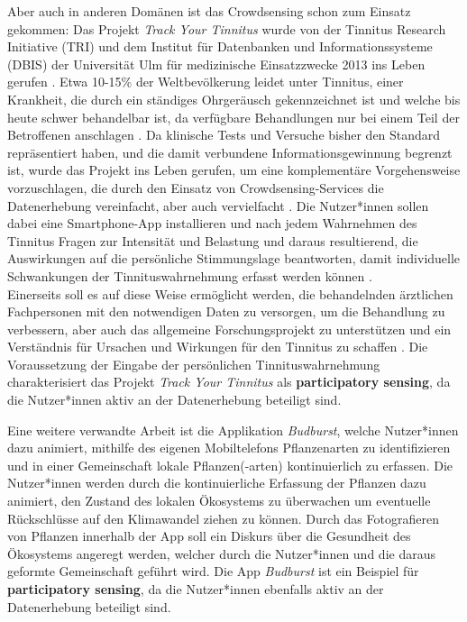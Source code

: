 Aber auch in anderen Domänen ist das Crowdsensing schon zum Einsatz gekommen: Das Projekt \textit{Track Your Tinnitus} wurde von der Tinnitus Research Initiative (TRI) und dem Institut für Datenbanken und Informationssysteme (DBIS) der Universität Ulm für medizinische Einsatzzwecke 2013 ins Leben gerufen \cite{Pryss2017}. Etwa 10-15\% der Weltbevölkerung leidet unter Tinnitus, einer Krankheit, die durch ein ständiges Ohrgeräusch gekennzeichnet ist und welche bis heute schwer behandelbar ist, da verfügbare Behandlungen nur bei einem Teil der Betroffenen anschlagen \cite{langguth2011review}. Da klinische Tests und Versuche bisher den Standard repräsentiert haben, und die damit verbundene Informationsgewinnung begrenzt ist, wurde das Projekt ins Leben gerufen, um eine komplementäre Vorgehensweise vorzuschlagen, die durch den Einsatz von Crowdsensing-Services die Datenerhebung vereinfacht, aber auch vervielfacht \cite{pryss2015mobile}. Die Nutzer*innen sollen dabei eine Smartphone-App installieren und nach jedem Wahrnehmen des Tinnitus Fragen zur Intensität und Belastung und daraus resultierend, die Auswirkungen auf die persönliche Stimmungslage beantworten, damit individuelle Schwankungen der Tinnituswahrnehmung erfasst werden können \cite{pryss2015mobile}. \\ Einerseits soll es auf diese Weise ermöglicht werden, die behandelnden ärztlichen Fachpersonen mit den notwendigen Daten zu versorgen, um die Behandlung zu verbessern, aber auch das allgemeine Forschungsprojekt zu unterstützen und ein Verständnis für Ursachen und Wirkungen für den Tinnitus zu schaffen \cite{pryss2015mobile}. Die Voraussetzung der Eingabe der persönlichen Tinnituswahrnehmung charakterisiert das Projekt \textit{Track Your Tinnitus} als \textbf{participatory sensing}, da die Nutzer*innen aktiv an der Datenerhebung beteiligt sind.

Eine weitere verwandte Arbeit ist die Applikation \textit{Budburst}, welche Nutzer*innen dazu animiert, mithilfe des eigenen Mobiltelefons Pflanzenarten zu identifizieren und in einer Gemeinschaft lokale Pflanzen(-arten) kontinuierlich zu erfassen. Die Nutzer*innen werden durch die kontinuierliche Erfassung der Pflanzen dazu animiert, den Zustand des lokalen Ökosystems zu überwachen um eventuelle Rückschlüsse auf den Klimawandel ziehen zu können. Durch das Fotografieren von Pflanzen innerhalb der App soll ein Diskurs über die Gesundheit des Ökosystems angeregt werden, welcher durch die Nutzer*innen und die daraus geformte Gemeinschaft geführt wird. Die App \textit{Budburst} ist ein Beispiel für \textbf{participatory sensing}, da die Nutzer*innen ebenfalls aktiv an der Datenerhebung beteiligt sind.

